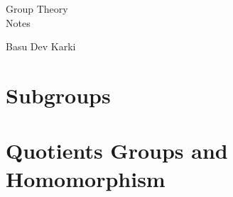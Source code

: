 \documentclass[12pt]{article}
\theoremstyle{definition}
\theoremstyle{plain}
\theoremstyle{definition}
\begin{document}
\begin{titlepage}
    \centering
    \vspace*{4cm} %

    {\Huge Group Theory\\[0.5em]
    \huge Notes\\[1em]}
    
    {\LARGE Basu Dev Karki\par}
\end{titlepage}

{
    \thispagestyle{plain}
    \tableofcontents
}

\eject
\section{Subgroups}

\eject

\eject

\eject


\eject
\section{Quotients Groups and Homomorphism}

\eject

\end{document}
